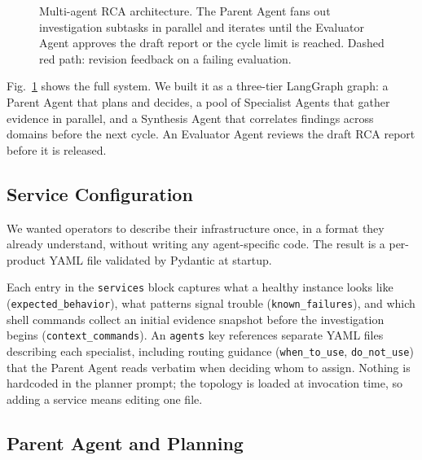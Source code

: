\documentclass[conference]{IEEEtran}
\begin{document}
\begin{figure}[t]
{%
}%
\caption{Multi-agent RCA architecture. The Parent Agent fans out
  investigation subtasks in parallel and iterates until the Evaluator
  Agent approves the draft report or the cycle limit is reached.
  Dashed red path: revision feedback on a failing evaluation.}
\label{fig:architecture}
\end{figure}


Fig.~\ref{fig:architecture} shows the full system. We built it as a
three-tier LangGraph graph: a Parent Agent that plans and decides, a
pool of Specialist Agents that gather evidence in parallel, and a
Synthesis Agent that correlates findings across domains before the
next cycle. An Evaluator Agent reviews the draft RCA report before it
is released.

\subsection{Service Configuration}

We wanted operators to describe their infrastructure once, in a format
they already understand, without writing any agent-specific code. The
result is a per-product YAML file validated by Pydantic at startup.

Each entry in the \texttt{services} block captures what a healthy
instance looks like (\texttt{expected\_behavior}), what patterns
signal trouble (\texttt{known\_failures}), and which shell commands
collect an initial evidence snapshot before the investigation begins
(\texttt{context\_commands}). An \texttt{agents} key references
separate YAML files describing each specialist, including routing
guidance (\texttt{when\_to\_use}, \texttt{do\_not\_use}) that the
Parent Agent reads verbatim when deciding whom to assign. Nothing
is hardcoded in the planner prompt; the topology is loaded at
invocation time, so adding a service means editing one file.

\subsection{Parent Agent and Planning}
\end{document}
